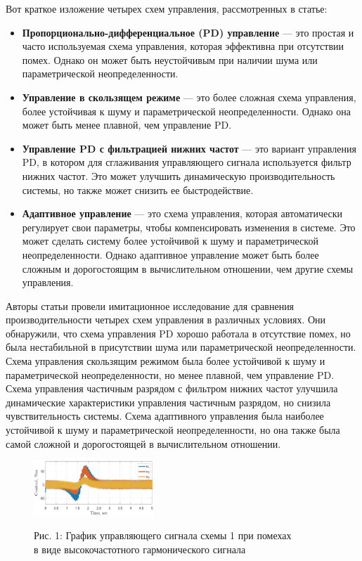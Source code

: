 \documentclass[russian,11pt]{article}
\begin{document}
Вот краткое изложение четырех схем управления, рассмотренных в статье:
\begin{itemize}
\item \textbf{Пропорционально-дифференциальное (PD) управление} --- 
это простая и часто используемая схема управления, которая эффективна при отсутствии помех. Однако он может быть неустойчивым при наличии шума или параметрической неопределенности.
\item \textbf{Управление в скользящем режиме} --- это более сложная схема управления, более устойчивая к шуму и параметрической неопределенности. Однако она может быть менее плавной, чем управление PD.
\item \textbf{Управление PD с фильтрацией нижних частот} --- это вариант управления PD, в котором для сглаживания управляющего сигнала используется фильтр нижних частот. Это может улучшить динамическую производительность системы, но также может снизить ее быстродействие.
\item \textbf{Адаптивное управление} --- это схема управления, которая автоматически регулирует свои параметры, чтобы компенсировать изменения в системе. Это может сделать систему более устойчивой к шуму и параметрической неопределенности. Однако адаптивное управление может быть более сложным и дорогостоящим в вычислительном отношении, чем другие схемы управления.
\end{itemize}

Авторы статьи провели имитационное исследование для сравнения производительности четырех схем управления в различных условиях. Они обнаружили, что схема управления PD хорошо работала в отсутствие помех, но была нестабильной в присутствии шума или параметрической неопределенности. Схема управления скользящим режимом была более устойчивой к шуму и параметрической неопределенности, но менее плавной, чем управление PD. Схема управления частичным разрядом с фильтром нижних частот улучшила динамические характеристики управления частичным разрядом, но снизила чувствительность системы. Схема адаптивного управления была наиболее устойчивой к шуму и параметрической неопределенности, но она также была самой сложной и дорогостоящей в вычислительном отношении.
\pagebreak

\begin{figure}[!h]
\centering
\includegraphics[width=0.4\textwidth]{1_scheme1_harmonic}
\begin{center}{\footnotesize Рис. 1: График управляющего сигнала схемы 1 при помехах \\в виде высокочастотного гармонического сигнала}\end{center}
\end{figure}
\end{document}
